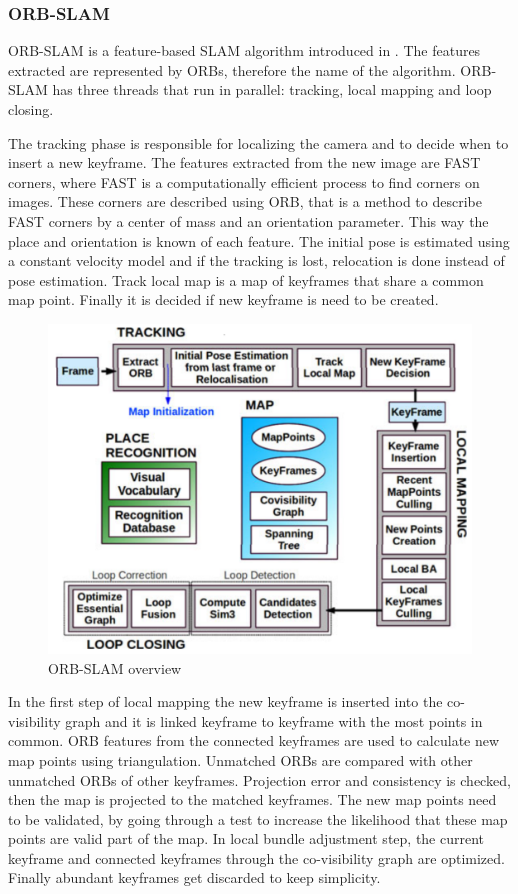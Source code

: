 \subsubsection{ORB-SLAM}
ORB-SLAM is a feature-based SLAM algorithm introduced in \cite{mur2015orb}. The features extracted are represented by ORBs,
therefore the name of the algorithm. ORB-SLAM has three threads that run in parallel: tracking, local mapping and 
loop closing.

The tracking phase is responsible for localizing the camera and to decide when to insert a new keyframe.
The features extracted from the new image are FAST corners, where FAST is a computationally efficient process to find corners
on images. These corners are described using ORB, that is a method to describe FAST corners by a center of mass and
an orientation parameter. This way the place and orientation is known of each feature. The initial pose is estimated using 
a constant velocity model and if the tracking is lost, relocation is done instead of pose estimation.
Track local map is a map of keyframes that share a common map point. Finally it is decided if new keyframe is need to be
created.


\begin{figure}[!hb]
    \centering
    \includegraphics[width=150mm, keepaspectratio]{figures/orb_slam_overview.png}
    \caption{ORB-SLAM overview \cite{mur2015orb}}
    \label{fig:orb_slam_overview}
\end{figure}


In the first step of local mapping the new keyframe is inserted into the co-visibility graph and it is linked keyframe to keyframe
with the most points in common. ORB features from the connected keyframes are used to calculate new map points using triangulation. 
Unmatched ORBs are compared with other unmatched ORBs of other keyframes. Projection error and consistency is checked, then the 
map is projected to the matched keyframes. The new map points need to be validated, by going through a test to increase the 
likelihood that these map points are valid part of the map. In local bundle adjustment step, the current keyframe and connected
keyframes through the co-visibility graph are optimized. Finally abundant keyframes get discarded to keep simplicity.

